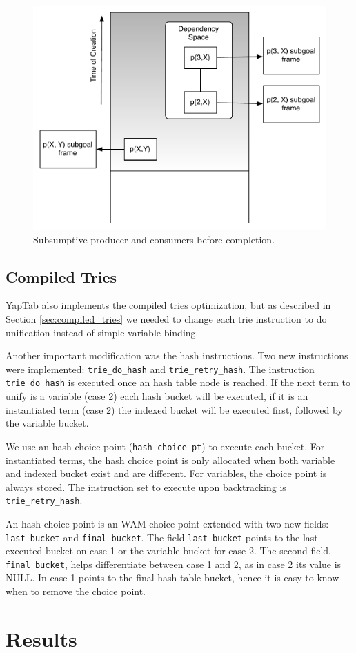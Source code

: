 \begin{figure}[H]
  \centering
    \includegraphics[scale=0.6]{completion_space.pdf}
  \caption{Subsumptive producer and consumers before completion.}
  \label{fig:completion_space}
\end{figure}

\subsection{Compiled Tries}

YapTab also implements the compiled tries optimization, but as described in Section \ref{sec:compiled_tries}
we needed to change each trie instruction to do unification instead of simple variable binding.

Another important modification was the hash instructions. Two new instructions were
implemented: \texttt{trie\_do\_hash} and \texttt{trie\_retry\_hash}.
The instruction \texttt{trie\_do\_hash} is executed once an hash table node is reached.
If the next term to unify is a variable (case 2) each hash bucket will be executed, if it is an instantiated term (case 2)
the indexed bucket will be executed first, followed by the variable bucket.

We use an hash choice point (\texttt{hash\_choice\_pt}) to execute each bucket.
For instantiated terms, the hash choice point is only allocated when both variable and indexed bucket
exist and are different. For variables, the choice point is always stored. The instruction
set to execute upon backtracking is \texttt{trie\_retry\_hash}.

An hash choice point is an WAM choice point extended with two new fields:
\texttt{last\_bucket} and \texttt{final\_bucket}.
The field \texttt{last\_bucket} points to the last executed bucket on case 1 or the
variable bucket for case 2.
The second field, \texttt{final\_bucket}, helps differentiate between
case 1 and 2, as in case 2 its value is NULL. In case 1 points to the final hash table bucket,
hence it is easy to know when to remove the choice point.

\section{Results}
